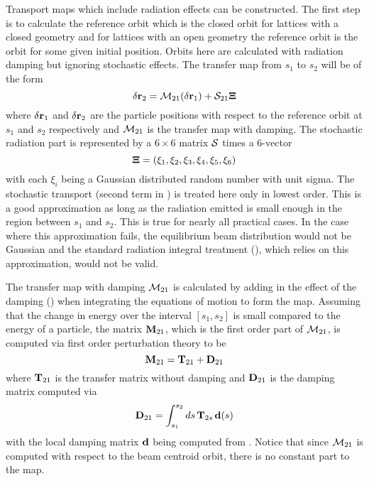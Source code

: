 Transport maps which include radiation effects can be constructed\cite{b:ohmi}. The first step is to
calculate the reference orbit which is the closed orbit for lattices with a closed geometry and for
lattices with an open geometry the reference orbit is the orbit for some given initial
position. Orbits here are calculated with radiation damping but ignoring stochastic effects. The
transfer map from $s_1$ to $s_2$ will be of the form
\begin{equation}
  \delta{\bf r}_2 = {\cal M}_{21}(\delta{\bf r}_1) + {\cal S}_{21} {\bf \Xi}
  \label{rmrsx}
\end{equation}
where $\delta{\bf r}_1$ and $\delta{\bf r}_2$ are the particle positions with respect to the reference
orbit at $s_1$ and $s_2$ respectively and ${\cal M}_{21}$ is the transfer map with damping. The
stochastic radiation part is represented by a $6\times6$ matrix ${\cal S}$ times a $6$-vector
\begin{equation}
  {\bf \Xi} = (\xi_1, \xi_2, \xi_3, \xi_4, \xi_5, \xi_6)
\end{equation}
with each $\xi_i$ being a Gaussian distributed random number with unit sigma. The stochastic
transport (second term in ) is treated here only in lowest order. This is a good
approximation as long as the radiation emitted is small enough in the region between $s_1$ and
$s_2$. This is true for nearly all practical cases. In the case where this approximation fails, the
equilibrium beam distribution would not be Gaussian and the standard radiation integral treatment
(), which relies on this approximation, would not be valid.

The transfer map with damping ${\cal M}_{21}$ is calculated by adding in the effect of the damping
() when integrating the equations of motion to form the map. Assuming that the change in
energy over the interval $[s_1, s_2]$ is small compared to the energy of a particle, the matrix
${\bf M}_{21}$, which is the first order part of ${\cal M}_{21}$, is computed via first order perturbation
theory to be
\begin{equation}
  {\bf M}_{21} = {\bf T}_{21} + {\bf D}_{21}
\end{equation}
where ${\bf T}_{21}$ is the transfer matrix without damping and ${\bf D}_{21}$ is the damping matrix
computed via
\begin{equation}
  {\bf D}_{21} = \int_{s_1}^{s_2} ds \, {\bf T}_{2s} \, {\bf d}(s)
\end{equation}
with the local damping matrix ${\bf d}$ being computed from . Notice that since ${\cal M}_{21}$
is computed with respect to the beam centroid orbit, there is no constant part to the map.

